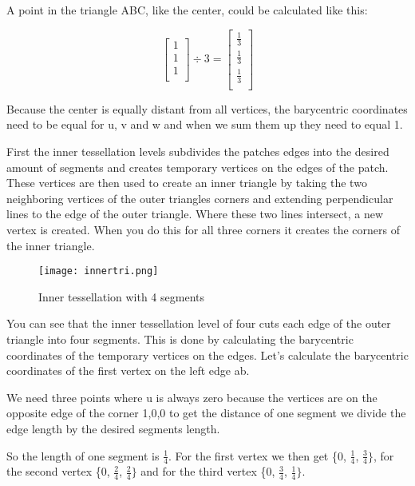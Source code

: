 \documentclass[12pt]{report} \usepackage{preamble}
\begin{document}
A point in the triangle ABC, like the center, could be calculated like this:

\[
	\begin{bmatrix}
		1 \\
		1 \\
		1 \\
	\end{bmatrix}
	\div
	3
	=
	\begin{bmatrix}
		\frac{1}{3} \\
		\frac{1}{3} \\
		\frac{1}{3} \\
	\end{bmatrix}
\]

Because the center is equally distant from all vertices,
the barycentric coordinates need to be equal for u, v and w
and when we sum them up they need to equal 1.

First the inner tessellation levels subdivides the patches edges into the desired amount of segments and
creates temporary vertices on the edges of the patch. These vertices are then used to create an
inner triangle by taking the two neighboring vertices of the outer triangles corners and extending perpendicular
lines to the edge of the outer triangle. Where these two lines intersect, a new vertex is created. When you
do this for all three corners it creates the corners of the inner triangle. \cite{tessellation}

\begin{figure}[hbtp]
	\centering \texttt{[image: innertri.png]}
	\caption{Inner tessellation with 4 segments}
	\cite{fig:inner-tessellation}
\end{figure} \floatbarrier

You can see that the inner tessellation level of four cuts each edge of the outer triangle into four segments.
This is done by calculating the barycentric coordinates of the temporary vertices on the edges. Let's
calculate the barycentric coordinates of the first vertex on the left edge ab.

We need three points where u is always zero because the vertices are on the opposite edge of the corner {1,0,0}
to get the distance of one segment we divide the edge length by the desired segments length.

So the length of one segment is \(\frac{1}{4}\).
For the first vertex we then get \{0, \(\frac{1}{4}\), \(\frac{3}{4}\}\), for the second
vertex \{0, \(\frac{2}{4}\), \(\frac{2}{4}\}\) and for the third vertex \{0, \(\frac{3}{4}\), \(\frac{1}{4}\}\).
\end{document}
